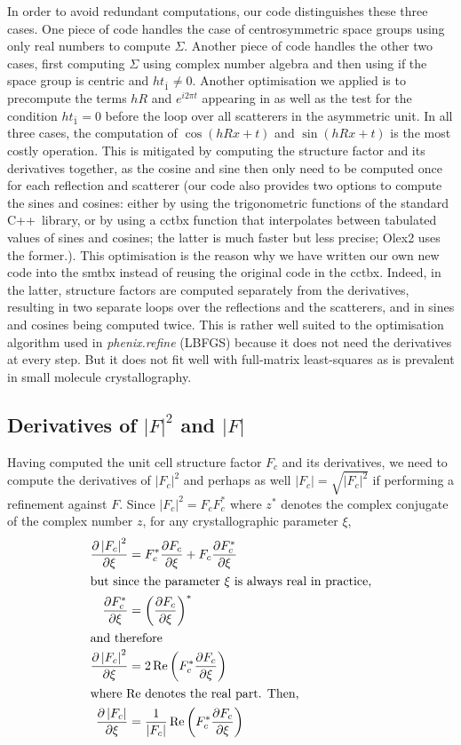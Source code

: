 \documentclass[pdf]{iucr}
\newcommand{\cpp}{C++}
\newcommand{\re}{\operatorname{Re}}
\newcommand{\modulus}[1]{\left| #1 \right|}
\newcommand{\partialder}[2]{\frac{\partial #1}{\partial #2}}
\begin{document}
In order to avoid redundant computations, our code distinguishes these three cases. One piece of code handles the case of centrosymmetric space groups using only real numbers to compute $\Sigma$. Another piece of code handles the other two cases, first computing $\Sigma$ using complex number algebra and then using  if the space group is centric and $h t_{\bar{1}} \neq 0$. Another optimisation we applied is to precompute the terms $hR$ and $e^{i2\pi t}$ appearing in  as well as the test for the condition $h t_{\bar{1}}=0$ before the loop over all scatterers in the asymmetric unit. In all three cases, the computation of $\cos(hRx + t)$ and $\sin(hRx + t)$ is the most costly operation. This is mitigated by computing the structure factor and its derivatives together, as the cosine and sine then only need to be computed once for each reflection and scatterer (our code also provides two options to compute the sines and cosines: either by using the trigonometric functions of the standard \cpp\ library, or by using a cctbx function that interpolates between tabulated values of sines and cosines; the latter is much faster but less precise; Olex2 uses the former.).
This optimisation is the reason why we have written our own new code into the smtbx instead of reusing the original code in the cctbx. Indeed, in the latter, structure factors are computed separately from the derivatives, resulting in two separate loops over the reflections and the scatterers, and in sines and cosines being computed twice. This is rather well suited to the optimisation algorithm used in \emph{phenix.refine} (LBFGS) because it does not need the derivatives at every step. But it does not fit well with full-matrix least-squares as is prevalent in small molecule crystallography.  

\subsection{Derivatives of $\modulus{F}^2$ and $\modulus{F}$}

Having computed the unit cell structure factor $F_c$ and its derivatives, we need to compute the derivatives of $\modulus{F_c}^2$ and perhaps as well $\modulus{F_c} = \sqrt{\modulus{F_c}^2}$ if performing a refinement against $F$. Since $\modulus{F_c}^2 = F_c F_c^*$ where $z^*$ denotes the complex conjugate of the complex number $z$, for any crystallographic parameter $\xi$,
\begin{align}
\partialder{\modulus{F_c}^2}{\xi} &= F_c^* \partialder{F_c}{\xi} + F_c \partialder{F_c^*}{\xi} \nonumber \\
\shortintertext{but since the parameter $\xi$ is always real in practice,}
\partialder{F_c^*}{\xi} &= \left( \partialder{F_c}{\xi} \right)^* \\
\shortintertext{and therefore}
\partialder{\modulus{F_c}^2}{\xi} &= 2\re\left( F_c^* \partialder{F_c}{\xi}\right) \\
\shortintertext{where $\re$ denotes the real part. Then,}
\partialder{\modulus{F_c}}{\xi} &= \frac{1}{\modulus{F_c}} \re\left( F_c^* \partialder{F_c}{\xi}\right)
\end{align}
\end{document}
